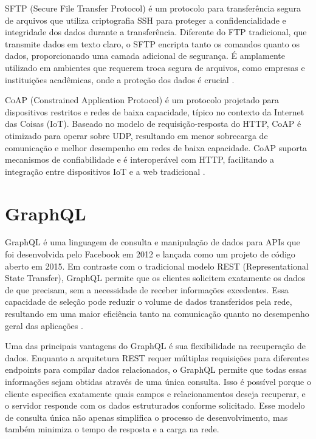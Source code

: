 SFTP (Secure File Transfer Protocol) é um protocolo para transferência segura de arquivos que utiliza criptografia SSH para proteger a confidencialidade e integridade dos dados durante a transferência. Diferente do FTP tradicional, que transmite dados em texto claro, o SFTP encripta tanto os comandos quanto os dados, proporcionando uma camada adicional de segurança. É amplamente utilizado em ambientes que requerem troca segura de arquivos, como empresas e instituições acadêmicas, onde a proteção dos dados é crucial \cite{barrett2005}.

CoAP (Constrained Application Protocol) é um protocolo projetado para dispositivos restritos e redes de baixa capacidade, típico no contexto da Internet das Coisas (IoT). Baseado no modelo de requisição-resposta do HTTP, CoAP é otimizado para operar sobre UDP, resultando em menor sobrecarga de comunicação e melhor desempenho em redes de baixa capacidade. CoAP suporta mecanismos de confiabilidade e é interoperável com HTTP, facilitando a integração entre dispositivos IoT e a web tradicional \cite{bormann2012}.

\section{GraphQL}

GraphQL é uma linguagem de consulta e manipulação de dados para APIs que foi desenvolvida pelo Facebook em 2012 e lançada como um projeto de código aberto em 2015. Em contraste com o tradicional modelo REST (Representational State Transfer), GraphQL permite que os clientes solicitem exatamente os dados de que precisam, sem a necessidade de receber informações excedentes. Essa capacidade de seleção pode reduzir o volume de dados transferidos pela rede, resultando em uma maior eficiência tanto na comunicação quanto no desempenho geral das aplicações \cite{silveira2019}.

Uma das principais vantagens do GraphQL é sua flexibilidade na recuperação de dados. Enquanto a arquitetura REST requer múltiplas requisições para diferentes endpoints para compilar dados relacionados, o GraphQL permite que todas essas informações sejam obtidas através de uma única consulta. Isso é possível porque o cliente especifica exatamente quais campos e relacionamentos deseja recuperar, e o servidor responde com os dados estruturados conforme solicitado. Esse modelo de consulta única não apenas simplifica o processo de desenvolvimento, mas também minimiza o tempo de resposta e a carga na rede.

